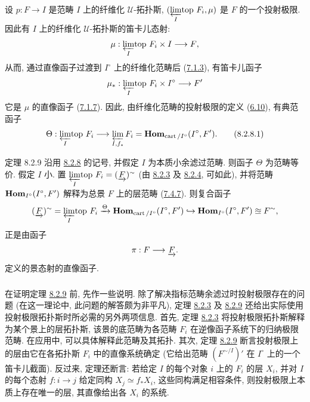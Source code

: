 \subsubsection{}

设 $p:F\to I$ 是范畴 $I$ 上的纤维化 $𝒰$-拓扑斯,
$({\displaystyle{\varprojlim_{I}\!\mbox{\rm top }}}F_i,\mu)$ 是 $F$ 的一个投射极限.
因此有 $I$ 上的纤维化 $𝒰$-拓扑斯的笛卡儿态射:
$$
\mu:\limtop{I} F_i \times I \to F{\quoi},
$$
从而, 通过直像函子过渡到 $I^{\circ}$ 上的纤维化范畴后
(\hyperref[VI.subsubsec7.1.3]{7.1.3}), 有笛卡儿函子
$$
\mu_{\ast}: \limtop{I} F_i \times I^{\circ} \to F'
$$
它是 $\mu$ 的直像函子 (\hyperref[VI.subsubsec7.1.7]{7.1.7}).
因此, 由纤维化范畴的投射极限的定义
(\hyperref[VI.subsec6.10]{6.10}), 有典范函子
\begin{equation*}
\Theta : \limtop{I} F_i  \to
\varprojlim_{I, f_{\ast}} F_i = \Hhom_{\cart/I^{\circ}} (I^{\circ},
F'){\quoi}.\tag{8.2.8.1}
\end{equation*}

\begin{enonce*}{定理 8.2.9}
沿用 \hyperref[VI.subsubsec8.2.8]{8.2.8} 的记号,
并假定 $I$ 为本质小余滤过范畴.
则函子 $\Theta$ 为范畴等价.
假定 $I$ 小. 置 ${\displaystyle{\varprojlim_{I}\!\mbox{\rm top }}}F_i=(\underrightarrow{F})^{\sim}$
(由 \hyperref[VI.thm8.2.3]{8.2.3}
及 \hyperref[VI.rem8.2.4]{8.2.4}, 可如此),
并将范畴 $\operatorname{\mathbf{Hom}}_{I^{\circ}}(I^{\circ},F')$
解释为总景 $F$ 上的层范畴 (\hyperref[VI.prop7.4.7]{7.4.7}).
则复合函子
$$
(\underrightarrow{F})^{\sim} = {\displaystyle{\varprojlim_{I}\!\mbox{\rm top }}} F_i
\xrightarrow{\Theta} \operatorname{\mathbf{Hom}}_{\operatorname{cart}/I^{\circ}} (I^{\circ}, F') \hookrightarrow \operatorname{\mathbf{Hom}}_{I^{\circ}}
(I^{\circ}, F') \approxeq F^{\sim}{},
$$
正是由函子
$$
\pi : F \to \underrightarrow{F}{\quoi}.
$$
定义的景态射的直像函子.
\end{enonce*}

\setcounter{subsubsection}{9}
\subsubsection{}

在证明定理 \hyperref[VI.thm8.2.9]{8.2.9} 前,
先作一些\pageoriginale{}说明.
除了解决指标范畴余滤过时投射极限存在的问题
(在这一理论中, 此问题的解答颇为非平凡),
定理 \hyperref[VI.thm8.2.3]{8.2.3}
及 \hyperref[VI.thm8.2.9]{8.2.9}
还给出实际使用投射极限拓扑斯时所必需的另外两项信息.
首先, 定理 \hyperref[VI.thm8.2.3]{8.2.3}
将投射极限拓扑斯解释为某个景上的层拓扑斯,
该景的底范畴为各范畴 $F_i$ 在逆像函子系统下的归纳极限范畴.
在应用中, 可以具体解释此范畴及其拓扑.
其次, 定理 \hyperref[VI.thm8.2.9]{8.2.9}
断言投射极限上的层由它在各拓扑斯 $F_i$ 中的直像系统确定
(它给出范畴 $(F^{\sim/I})'$ 在 $I^{\circ}$ 上的一个笛卡儿截面).
反过来, 定理还断言:
若给定 $I$ 的每个对象 $i$ 上的 $F_i$ 的层 $X_i$,
并对 $I$ 的每个态射 $f:i\to j$ 给定同构
$X_j\simeq f_{\ast}X_i$,
这些同构满足相容条件,
则投射极限上本质上存在唯一的层,
其直像给出各 $X_i$ 的系统.

